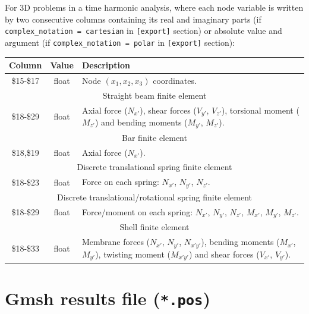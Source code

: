 \documentclass[a4paper,fleqn]{book}
\begin{document}
For 3D problems in a time harmonic analysis, where each node variable is written by two consecutive columns containing its real and imaginary parts (if \texttt{complex\_notation = cartesian} in \texttt{[export]} section) or absolute value and argument (if \texttt{complex\_notation = polar} in \texttt{[export]} section):
\begin{longtable}{ccp{11cm}}
\textbf{Column} & \textbf{Value} &\textbf{Description} \\ 
\endhead
\midrule
\$15-\$17 & float & Node $(x_1,x_2,x_3)$ coordinates. \\
\midrule
\multicolumn{3}{c}{Straight beam finite element} \\
\$18-\$29 & float & Axial force ($N_{x'}$), shear forces ($V_{y'}$, $V_{z'}$), torsional moment ($M_{z'}$) and bending moments ($M_{y'}$, $M_{z'}$). \\
\midrule
\multicolumn{3}{c}{Bar finite element} \\
\$18,\$19 & float & Axial force ($N_{x'}$). \\
\midrule
\multicolumn{3}{c}{Discrete translational spring finite element} \\
\$18-\$23 & float & Force on each spring: $N_{x'}$, $N_{y'}$, $N_{z'}$. \\
\midrule
\multicolumn{3}{c}{Discrete translational/rotational spring finite element} \\
\$18-\$29 & float & Force/moment on each spring: $N_{x'}$, $N_{y'}$, $N_{z'}$, $M_{x'}$, $M_{y'}$, $M_{z'}$. \\
\midrule
\multicolumn{3}{c}{Shell finite element} \\
\$18-\$33 & float & Membrane forces ($N_{x'}$, $N_{y'}$, $N_{x'y'}$), bending moments ($M_{x'}$, $M_{y'}$), twisting moment ($M_{x'y'}$) and shear forces ($V_{x'}$, $V_{y'}$).
\end{longtable}


\section{Gmsh results file (\texttt{*.pos})}
\end{document}
